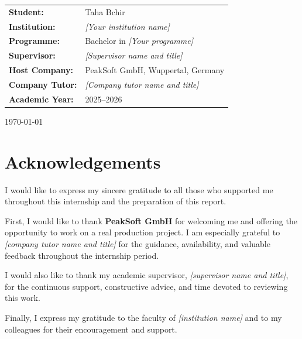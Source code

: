 ﻿\documentclass[12pt,a4paper]{report}
\begin{document}
{\begin{titlepage}
    \begin{flushleft}
      \renewcommand{\arraystretch}{1.3}
      \begin{tabular}{ll}
        \textbf{Student:}       & Taha Bchir \\
        \textbf{Institution:}   & \emph{[Your institution name]} \\
        \textbf{Programme:}     & Bachelor in \emph{[Your programme]} \\
        \textbf{Supervisor:}    & \emph{[Supervisor name and title]} \\
        \textbf{Host Company:}  & PeakSoft GmbH, Wuppertal, Germany \\
        \textbf{Company Tutor:} & \emph{[Company tutor name and title]} \\
        \textbf{Academic Year:} & 2025--2026 \\
      \end{tabular}
    \end{flushleft}

    \vfill
    {\large \today\par}
  \end{titlepage}
}

\setcounter{page}{1}


\chapter*{Acknowledgements}
{}

I would like to express my sincere gratitude to all those who supported me throughout
this internship and the preparation of this report.

First, I would like to thank \textbf{PeakSoft GmbH} for welcoming me and offering the
opportunity to work on a real production project.
I am especially grateful to \emph{[company tutor name and title]} for the guidance,
availability, and valuable feedback throughout the internship period.

I would also like to thank my academic supervisor, \emph{[supervisor name and title]},
for the continuous support, constructive advice, and time devoted to reviewing this work.

Finally, I express my gratitude to the faculty of \emph{[institution name]} and to my
colleagues for their encouragement and support.
\end{document}
